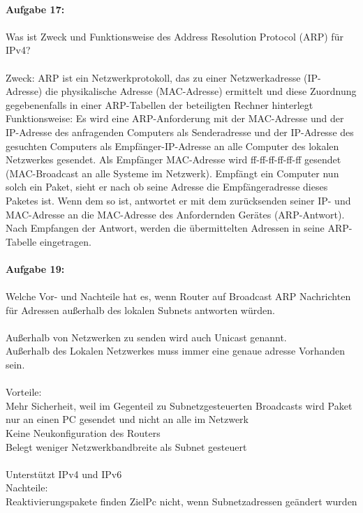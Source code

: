 \documentclass[12pt,a4paper]{report}
\begin{document}
\ \\
\textbf{Aufgabe 17:}
\\
\\
Was ist Zweck und Funktionsweise des Address Resolution Protocol (ARP) für IPv4? 
\\
\\
Zweck: ARP ist ein Netzwerkprotokoll, das zu einer Netzwerkadresse (IP-Adresse) die physikalische Adresse (MAC-Adresse) ermittelt und diese Zuordnung gegebenenfalls in einer ARP-Tabellen der beteiligten Rechner hinterlegt\\
Funktionsweise: Es wird eine ARP-Anforderung mit der MAC-Adresse und der IP-Adresse des anfragenden Computers als Senderadresse und der IP-Adresse des gesuchten Computers als Empfänger-IP-Adresse an alle Computer des lokalen Netzwerkes gesendet. Als Empfänger MAC-Adresse wird ff-ff-ff-ff-ff-ff gesendet (MAC-Broadcast an alle Systeme im Netzwerk). Empfängt ein Computer nun solch ein Paket, sieht er nach ob seine Adresse die Empfängeradresse dieses Paketes ist. Wenn dem so ist, antwortet er mit dem zurücksenden seiner IP- und MAC-Adresse an die MAC-Adresse
des Anfordernden Gerätes (ARP-Antwort). Nach Empfangen der Antwort, werden die übermittelten Adressen in seine ARP-Tabelle eingetragen.\\
\\
\textbf{Aufgabe 19:}
\\
\\
 Welche Vor- und Nachteile hat es, wenn Router auf Broadcast ARP Nachrichten für
 Adressen außerhalb des lokalen Subnets antworten würden.
\\
\\
Außerhalb von Netzwerken zu senden wird auch Unicast genannt.\\
Außerhalb des Lokalen Netzwerkes muss immer eine genaue adresse Vorhanden sein.\\
\\
Vorteile:\\
Mehr Sicherheit, weil im Gegenteil zu Subnetzgesteuerten Broadcasts wird Paket nur an einen
PC gesendet und nicht an alle im Netzwerk\\
Keine Neukonfiguration des Routers\\
Belegt weniger Netzwerkbandbreite als Subnet gesteuert\\
\\
Unterstützt IPv4 und IPv6\\
Nachteile:\\
Reaktivierungspakete finden ZielPc nicht, wenn Subnetzadressen geändert wurden\\
\end{document}
